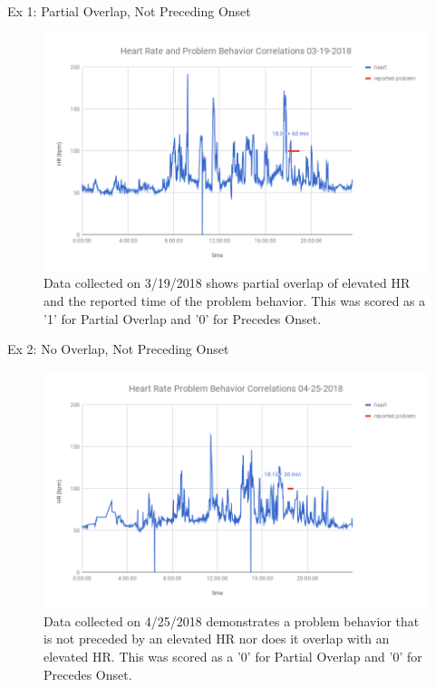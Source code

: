 \documentclass[final]{beamer}
\newlength{\onecolwid}
\newlength{\twocolwid}
\begin{document}
\begin{frame}[t]
\begin{columns}[t]
\begin{column}{\twocolwid}
\begin{columns}[t,totalwidth=\twocolwid]
\begin{column}{\onecolwid}
\begin{block}{Ex 1: Partial Overlap, Not Preceding Onset}
	
	\begin{figure}
		\includegraphics[width=0.8\linewidth]{Example1.png}
		\caption{Data collected on 3/19/2018 shows partial overlap of elevated HR and the reported time of the problem behavior. This was scored as a '1' for Partial Overlap and '0' for Precedes Onset.}
	\end{figure}
	
\end{block}


\begin{block}{Ex 2: No Overlap, Not Preceding Onset}
	
	\begin{figure}
		\includegraphics[width=0.8\linewidth]{Example2.png}
		\caption{Data collected on 4/25/2018 demonstrates a problem behavior that is not preceded by an elevated HR nor does it overlap with an elevated HR. This was scored as a '0' for Partial Overlap and '0' for Precedes Onset. }
	\end{figure}
	

\end{block}
\end{column}
\end{columns}
\end{column}
\end{columns}
\end{frame}
\end{document}
